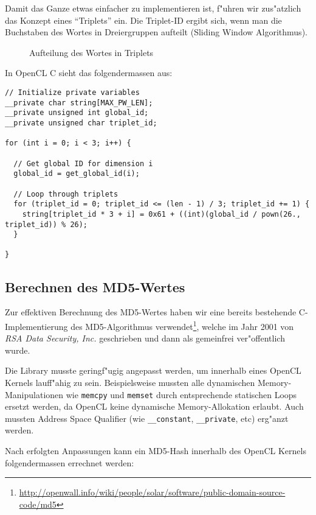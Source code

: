 \begin{refsection}
Damit das Ganze etwas einfacher zu implementieren ist, f"uhren wir zus"atzlich
das Konzept eines ``Triplets'' ein. Die Triplet-ID ergibt sich, wenn man die
Buchstaben des Wortes in Dreiergruppen aufteilt (Sliding Window Algorithmus).

\begin{figure}[H]
	\centering
	
	\caption{Aufteilung des Wortes in Triplets}
	\label{img:crypto:triplets}
\end{figure}

\noindent In OpenCL C sieht das folgendermassen aus:

\begin{small}
\begin{verbatim}
// Initialize private variables
__private char string[MAX_PW_LEN];
__private unsigned int global_id;
__private unsigned char triplet_id;

for (int i = 0; i < 3; i++) {

  // Get global ID for dimension i
  global_id = get_global_id(i);

  // Loop through triplets
  for (triplet_id = 0; triplet_id <= (len - 1) / 3; triplet_id += 1) {
    string[triplet_id * 3 + i] = 0x61 + ((int)(global_id / pown(26., triplet_id)) % 26);
  }

}
\end{verbatim}
\end{small}

\subsection{Berechnen des MD5-Wertes}

Zur effektiven Berechnung des MD5-Wertes haben wir eine bereits bestehende
C-Implementierung des MD5-Algorithmus
verwendet\footnote{\url{http://openwall.info/wiki/people/solar/software/public-domain-source-code/md5}},
welche im Jahr 2001 von \textit{RSA Data Security, Inc.} geschrieben und dann
als gemeinfrei ver"offentlich wurde.

Die Library musste geringf"ugig angepasst werden, um innerhalb eines OpenCL
Kernels lauff"ahig zu sein. Beispielsweise mussten alle dynamischen
Memory-Manipulationen wie \texttt{memcpy} und \texttt{memset} durch
entsprechende statischen Loops ersetzt werden, da OpenCL keine dynamische
Memory-Al\-lo\-ka\-ti\-on erlaubt. Auch mussten Address Space Qualifier (wie
\texttt{\_\_constant}, \texttt{\_\_private}, etc) erg"anzt werden.

Nach erfolgten Anpassungen kann ein MD5-Hash innerhalb des OpenCL Kernels
folgendermassen errechnet werden:


\end{refsection}
